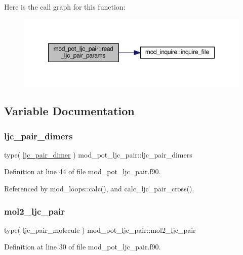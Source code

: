 Here is the call graph for this function\+:
\nopagebreak
\begin{figure}[H]
\begin{center}
\leavevmode
\includegraphics[width=350pt]{namespacemod__pot__ljc__pair_a0e073ba5b680fbad3e66c6119a8b0a00_cgraph}
\end{center}
\end{figure}


\subsection{Variable Documentation}
\mbox{\label{namespacemod__pot__ljc__pair_ad0c1c41e0227ea0136e97a69257a4132}} 
\subsubsection{\texorpdfstring{ljc\+\_\+pair\+\_\+dimers}{ljc\_pair\_dimers}}
{\footnotesize\ttfamily type( \hyperlink{structmod__pot__ljc__pair_1_1ljc__pair__dimer}{ljc\+\_\+pair\+\_\+dimer} ) mod\+\_\+pot\+\_\+ljc\+\_\+pair\+::ljc\+\_\+pair\+\_\+dimers}



Definition at line 44 of file mod\+\_\+pot\+\_\+ljc\+\_\+pair.\+f90.



Referenced by mod\+\_\+loops\+::calc(), and calc\+\_\+ljc\+\_\+pair\+\_\+cross().

\mbox{\label{namespacemod__pot__ljc__pair_af4f6357fdd649043f9ec44f39808a9ca}} 
\subsubsection{\texorpdfstring{mol2\+\_\+ljc\+\_\+pair}{mol2\_ljc\_pair}}
{\footnotesize\ttfamily type( ljc\+\_\+pair\+\_\+molecule ) mod\+\_\+pot\+\_\+ljc\+\_\+pair\+::mol2\+\_\+ljc\+\_\+pair}



Definition at line 30 of file mod\+\_\+pot\+\_\+ljc\+\_\+pair.\+f90.

